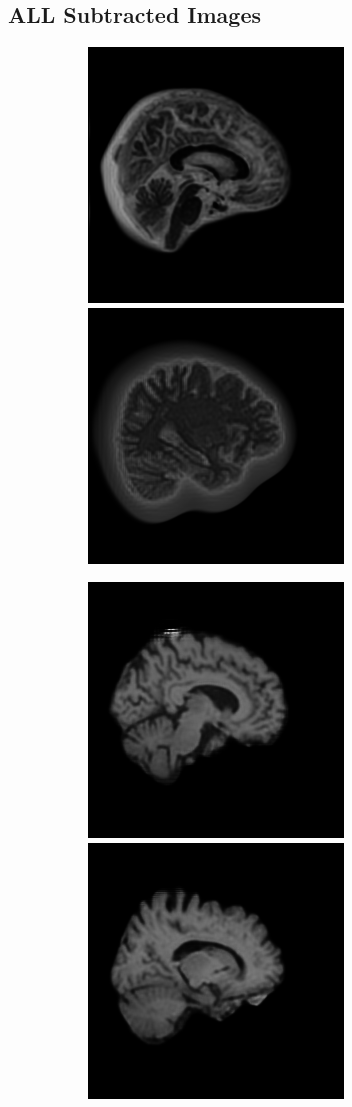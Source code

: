 \documentclass[12pt, fleqn, titlepage]{article}
\newcommand\skipper{1.4pt}
\newcommand\ripper{2.5pt}
\begin{document}
\subsection{ALL Subtracted Images}\label{all_subtracted_images}
\begin{figure}[H]
	\centering
	\begin{subfigure}[b]{0.7\textwidth}
		\centering
		\includegraphics[width=0.30\linewidth]{imgs/1.5T_bilinear}
		\hskip\skipper
		\includegraphics[width=0.30\linewidth]{imgs/3T_bilinear}
	\end{subfigure}
	\vskip\ripper
	\begin{subfigure}[b]{0.7\textwidth}
		\centering
		\includegraphics[width=0.30\linewidth]{imgs/1.5T_no_noise}
		\hskip\skipper
		\includegraphics[width=0.30\linewidth]{imgs/3T_no_noise}
	\end{subfigure}
\end{figure}
\end{document}
